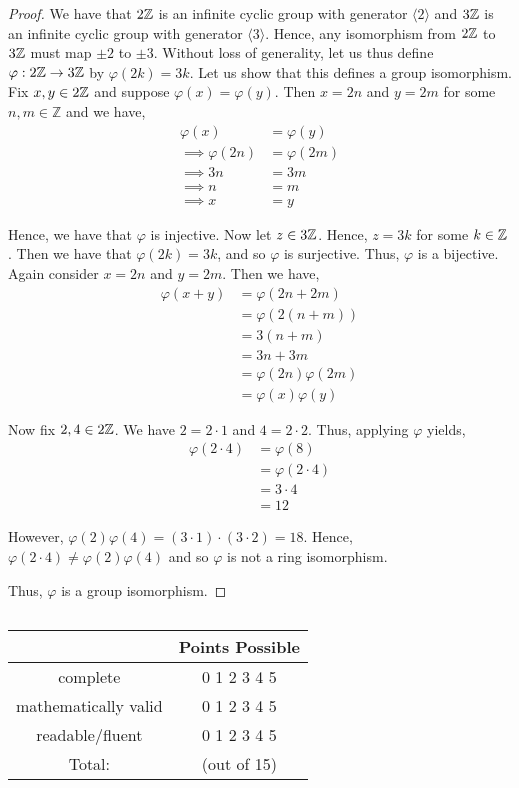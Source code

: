 \documentclass[11pt, reqno]{amsart}
\theoremstyle{plain}
\theoremstyle{definition}
\theoremstyle{example}
\newcommand{\Rubric}[1]{$~$\\\vfill \hfill{\def\arraystretch{1.75}\begin{tabular} {|c|c|} \hline
#1 & Points Possible  \\ \hline \hline
complete & \hspace{3mm} 0 \hspace{3mm} 1 \hspace{3mm} 2 \hspace{3mm} 
			3 \hspace{3mm} 4 \hspace{3mm} 5 \hspace{3mm} \\ \hline
mathematically valid & \hspace{3mm} 0 \hspace{3mm} 1 \hspace{3mm} 2 \hspace{3mm} 
			3 \hspace{3mm} 4 \hspace{3mm} 5 \hspace{3mm} \\ \hline
readable/fluent & \hspace{3mm} 0 \hspace{3mm} 1 \hspace{3mm} 2 \hspace{3mm} 
			3 \hspace{3mm} 4 \hspace{3mm} 5 \hspace{3mm} \\ \hline
Total:& \qquad\qquad\qquad(out of 15)\\
\hline
\end{tabular}}
\pagebreak}
\begin{document}
\begin{proof}
We have that $2\mathbb{Z}$ is an infinite cyclic group with generator $\langle 2 \rangle$ and $3\mathbb{Z}$ is an infinite cyclic group with generator $\langle 3 \rangle$. Hence, any isomorphism from $2\mathbb{Z}$ to $3\mathbb{Z}$ must map $\pm 2$ to $\pm 3$. Without loss of generality, let us thus define $\varphi: 2\mathbb{Z} \to 3\mathbb{Z}$ by $\varphi(2k) = 3k$. Let us show that this defines a group isomorphism. Fix $x, y \in 2\mathbb{Z}$ and suppose $\varphi(x) = \varphi(y)$. Then $x = 2n$ and $y = 2m$ for some $n, m \in \mathbb{Z}$ and we have,
\begin{align*}
\varphi(x) &= \varphi(y)\\
\implies \varphi(2n) &= \varphi(2m)\\
\implies 3n &= 3m\\
\implies n &= m\\
\implies x &= y
\end{align*}

Hence, we have that $\varphi$ is injective. Now let $z \in 3\mathbb{Z}$. Hence, $z = 3k$ for some $k \in \mathbb{Z}$. Then we have that $\varphi(2k) = 3k$, and so $\varphi$ is surjective. Thus, $\varphi$ is a bijective. Again consider $x = 2n$ and $y = 2m$. Then we have,
\begin{align*}
\varphi(x + y) &= \varphi(2n + 2m)\\
&= \varphi(2(n+m))\\
&= 3(n+m)\\
&= 3n + 3m\\
&= \varphi(2n)\varphi(2m)\\
&= \varphi(x)\varphi(y)
\end{align*}

Now fix $2, 4 \in 2\mathbb{Z}$. We have $2 = 2\cdot 1$ and $4 = 2 \cdot 2$. Thus, applying $\varphi$ yields,
\begin{align*}
\varphi(2 \cdot 4) &= \varphi(8)\\
&= \varphi(2 \cdot 4)\\
&= 3 \cdot 4\\
&= 12
\end{align*}

However, $\varphi(2)\varphi(4) = (3 \cdot 1) \cdot (3 \cdot 2) = 18$. Hence, $\varphi(2 \cdot 4) \neq \varphi(2)\varphi(4)$ and so $\varphi$ is not a ring isomorphism.

Thus, $\varphi$ is a group isomorphism.
\end{proof}

\Rubric{}
\newpage
\end{document}
